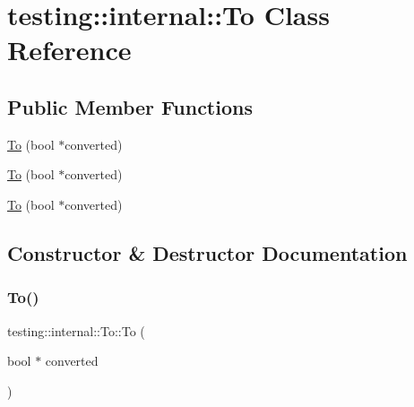 \hypertarget{classtesting_1_1internal_1_1_to}{}\section{testing\+::internal\+::To Class Reference}
\label{classtesting_1_1internal_1_1_to}
\subsection*{Public Member Functions}
\begin{DoxyCompactItemize}
\item 
\mbox{\hyperlink{classtesting_1_1internal_1_1_to_a447354e55d855ed0f1a1de8b2b54d345}{To}} (bool $\ast$converted)
\item 
\mbox{\hyperlink{classtesting_1_1internal_1_1_to_a447354e55d855ed0f1a1de8b2b54d345}{To}} (bool $\ast$converted)
\item 
\mbox{\hyperlink{classtesting_1_1internal_1_1_to_a447354e55d855ed0f1a1de8b2b54d345}{To}} (bool $\ast$converted)
\end{DoxyCompactItemize}


\subsection{Constructor \& Destructor Documentation}
\mbox{\label{classtesting_1_1internal_1_1_to_a447354e55d855ed0f1a1de8b2b54d345}} 
\subsubsection{\texorpdfstring{To()}{To()}\hspace{0.1cm}{\footnotesize\ttfamily [1/3]}}
{\footnotesize\ttfamily testing\+::internal\+::\+To\+::\+To (\begin{DoxyParamCaption}\item[{bool $\ast$}]{converted }\end{DoxyParamCaption})\hspace{0.3cm}{\ttfamily [inline]}}

\mbox{\label{classtesting_1_1internal_1_1_to_a447354e55d855ed0f1a1de8b2b54d345}} 
